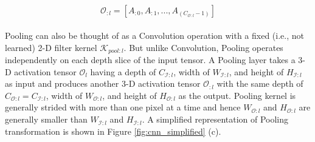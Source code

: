 \begin{align}
\label{eqn:conv_operator}
\begin{split}
\mathcal{O}_{:l} = [A_{:0}, A_{:1}, ... , A_{(C_{\mathcal{O}:l}-1)}]
\end{split}
\end{align}




Pooling can also be thought of as a Convolution operation with a fixed (i.e., not learned) 2-D filter kernel $\mathcal{K}_{pool:l}$.
But unlike Convolution, Pooling operates independently on each depth slice of the input tensor.
A Pooling layer takes a 3-D activation tensor $\mathcal{O}_{l}$ having a depth of $C_{\mathcal{I}:l}$, width of $W_{\mathcal{I}:l}$, and height of $H_{\mathcal{I}:l}$ as input and produces another 3-D activation tensor $\mathcal{O}_{:l}$ with the same depth of $C_{\mathcal{O}:l}=C_{\mathcal{I}:l}$, width of $W_{\mathcal{O}:l}$, and height of $H_{\mathcal{O}:l}$ as the output.
Pooling kernel is generally strided with more than one pixel at a time and hence $W_{\mathcal{O}:l}$ and $H_{\mathcal{O}:l}$ are generally smaller than $W_{\mathcal{I}:l}$ and $H_{\mathcal{I}:l}$.
A simplified representation of Pooling transformation is shown in Figure \ref{fig:cnn_simplified} (c).

